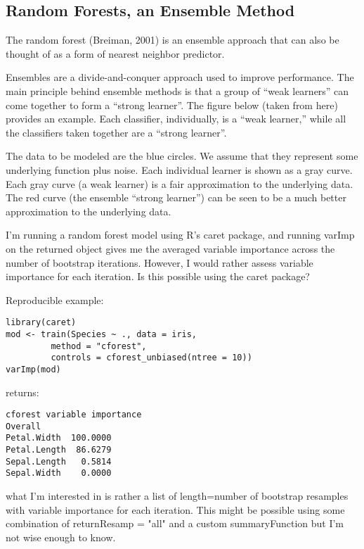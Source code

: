 \documentclass[caret-main.tex]{subfiles}
\begin{document}
\subsection{Random Forests, an Ensemble Method}

The random forest (Breiman, 2001) is an ensemble approach that can also be thought of as a form of nearest neighbor predictor.

Ensembles are a divide-and-conquer approach used to improve performance. The main principle behind ensemble methods is that a group of “weak learners” can come together to form a “strong learner”. The figure below (taken from here) provides an example. Each classifier, individually, is a “weak learner,” while all the classifiers taken together are a “strong learner”.

The data to be modeled are the blue circles. We assume that they represent some underlying function plus noise. Each individual learner is shown as a gray curve. Each gray curve (a weak learner) is a fair approximation to the underlying data. The red curve (the ensemble “strong learner”) can be seen to be a much better approximation to the underlying data.
\newpage

I'm running a random forest model using R's caret package, and running varImp on the returned object gives me the averaged variable importance across the number of bootstrap iterations. However, I would rather assess variable importance for each iteration. Is this possible using the caret package?

Reproducible example:
\begin{verbatim}
library(caret)
mod <- train(Species ~ ., data = iris,
         method = "cforest",
         controls = cforest_unbiased(ntree = 10))
varImp(mod)
\end{verbatim}
returns:
\begin{verbatim}
cforest variable importance
Overall
Petal.Width  100.0000
Petal.Length  86.6279
Sepal.Length   0.5814
Sepal.Width    0.0000 
\end{verbatim}
what I'm interested in is rather a list of length=number of bootstrap resamples with variable importance for each iteration. This might be possible using some combination of returnResamp = "all" and a custom summaryFunction but I'm not wise enough to know.
\end{document}
